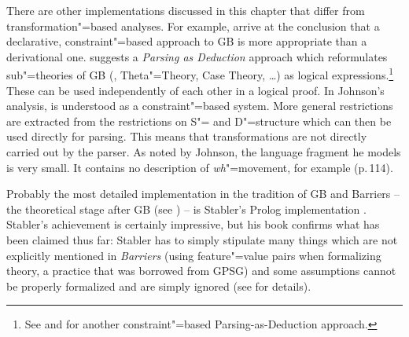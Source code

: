 There are other implementations discussed in this chapter that differ from transformation"=based analyses. For example, \citet[, Section~4]{KT91a}
arrive at the conclusion that a declarative, constraint"=based approach to GB is more appropriate than a derivational one. \citet{Johnson89a}
suggests a \emph{Parsing as Deduction} approach which reformulates sub"=theories of GB (\xbart,
Theta"=Theory, Case Theory, \ldots) as logical expressions.\footnote{
	See  and  for another constraint"=based Parsing-as-Deduction approach.
}
These can be used independently of each other in a logical proof. In Johnson's analysis, \gbt is understood as a constraint"=based system. 
More general restrictions are extracted from the restrictions on S"= and D"=structure which can then be used directly for parsing. This means that 
transformations are not directly carried out by the parser. As noted by Johnson, the language fragment he models is very small. It contains no
description of \emph{wh}"=movement, for example (p.\,114). 

Probably the most detailed implementation in the tradition of GB and Barriers -- the theoretical
stage after GB (see \citealp{Chomsky86b}) -- is Stabler's Prolog implementation
\citeyearpar{Stabler92a-u}. Stabler's achievement is certainly impressive, but his book confirms what has been claimed thus far: Stabler has to simply stipulate many
things which are not explicitly mentioned in \emph{Barriers} (\eg using feature"=value pairs when
formalizing \xbar theory, a practice that was borrowed from GPSG\indexgpsg) and some assumptions
cannot be properly formalized and are simply ignored (see \citealp{Briscoe97a} for details). 


